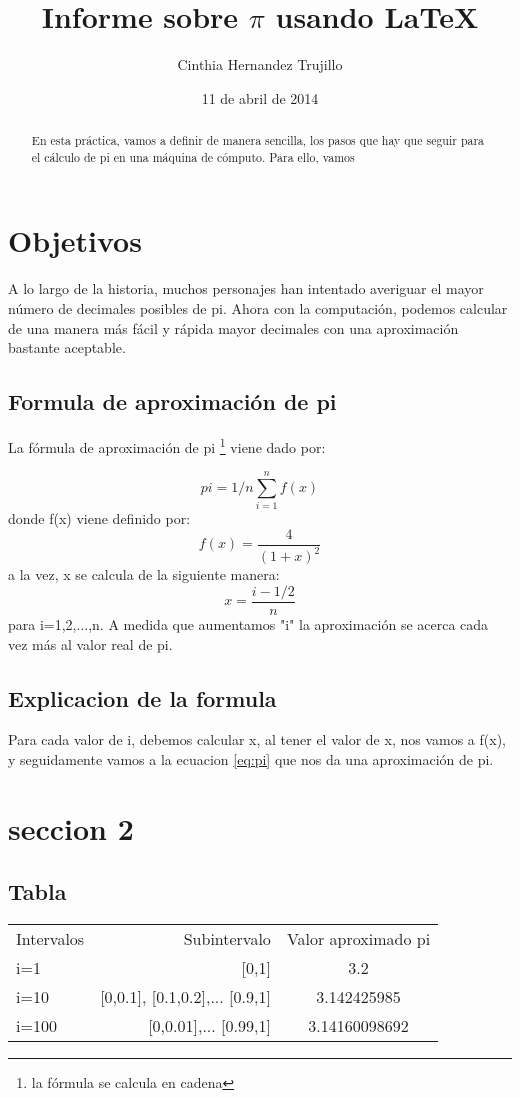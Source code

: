 \documentclass[spanish,a4paper,12pt]{article}
\begin{document}
\title{\bf Informe sobre $\pi$ usando \LaTeX{}}
\author{Cinthia Hernandez Trujillo}
\date{11 de abril de 2014}
\maketitle

\begin{abstract}
En esta práctica, vamos a definir de manera sencilla, los pasos que hay que seguir para el cálculo de pi en una máquina de cómputo. Para ello, vamos 
\end{abstract}

\section{Objetivos}
A lo largo de la historia, muchos personajes han intentado averiguar el mayor número de decimales posibles de pi. Ahora con la computación, podemos calcular
de una manera más fácil y rápida mayor decimales con una aproximación bastante aceptable.

\subsection{Formula de aproximación de pi}
La fórmula de aproximación de pi \footnote{la fórmula se calcula en cadena} viene dado por: 

\begin{equation}
   pi=1/n \sum_{i=1}^n f(x) 
   \label{eq:pi}
\end{equation}
donde f(x) viene definido por: 
\[
f(x)=\frac{4}{(1+x)^2}
\]
a la vez, x se calcula de la siguiente manera:
\[
x=\frac{i- 1/2}{n}
\]
para i=1,2,...,n. A medida que aumentamos "i" la aproximación se acerca cada vez más al valor real de pi.

\subsection{Explicacion de la formula}
Para cada valor de i, debemos calcular x, al tener el valor de x, nos vamos a f(x), y seguidamente vamos a la ecuacion \ref{eq:pi} que nos da una aproximación de pi.  

\section{seccion 2}

\subsection{Tabla}
\begin{tabular}{lrc}
    Intervalos & Subintervalo & Valor aproximado pi \\
    i=1 & [0,1] & 3.2 \\
    i=10 & [0,0.1], [0.1,0.2],... [0.9,1] &  3.142425985 \\
    i=100 & [0,0.01],... [0.99,1] & 3.14160098692 \\
\end{tabular}
\end{document}
